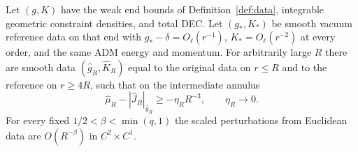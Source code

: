 \begin{lemma}\label{en:annular-replacement}
Let $(g,K)$ have the weak end bounds of Definition~\ref{def:data},
integrable geometric constraint densities, and total DEC. Let
$(g_*,K_*)$ be smooth vacuum reference data on that end with
$g_*-\delta=O_\ell(r^{-1})$, $K_*=O_\ell(r^{-2})$ at every order,
and the same ADM energy and momentum. For arbitrarily large $R$
there are smooth data $(\widehat g_R,\widehat K_R)$ equal to the
original data on $r\leq R$ and to the reference on $r\geq4R$,
such that on the intermediate annulus
\begin{equation}\label{en:annular-deficit}
 \widehat\mu_R-|\widehat J_R|_{\widehat g_R}
 \geq-\eta_RR^{-3},\qquad \eta_R\longrightarrow0.
\end{equation}
For every fixed $1/2<\beta<\min(q,1)$ the scaled perturbations
from Euclidean data are $O(R^{-\beta})$ in $C^2\times C^1$.
\end{lemma}

